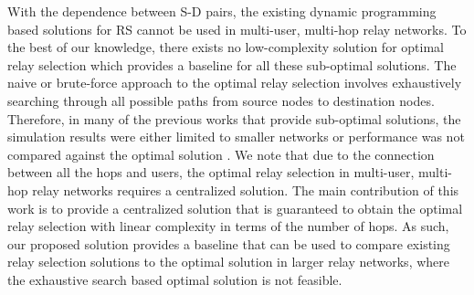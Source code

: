 \documentclass[12pt,draftclsnofoot,onecolumn]{IEEEtran}
\begin{document}
	With the dependence between S-D pairs, the existing dynamic programming based solutions for RS cannot be used in multi-user, multi-hop relay networks. To the best of our knowledge, there exists no low-complexity solution for optimal relay selection which provides a baseline for all these sub-optimal solutions. The naive or brute-force approach to the optimal relay selection involves exhaustively searching through all possible paths from source nodes to destination nodes. Therefore, in many of the previous works that provide sub-optimal solutions, the simulation results were either limited to smaller networks or performance was not compared against the optimal solution \cite{2809748}. We note that due to the connection between all the hops and users, the optimal relay selection in multi-user, multi-hop relay networks requires a centralized solution. The main contribution of this work is to provide a centralized solution that is guaranteed to obtain the optimal relay selection with linear complexity in terms of the number of hops. As such, our proposed solution provides a baseline that can be used to compare existing relay selection solutions to the optimal solution in larger relay networks, where the exhaustive search based optimal solution is not feasible.	
	
\end{document}
